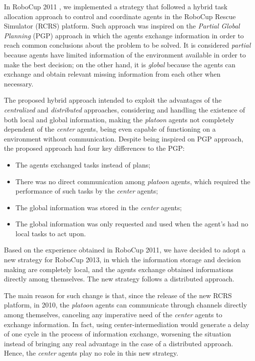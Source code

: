 In RoboCup 2011 \cite{pereiraEtAl2011-robocup}, we implemented a strategy that followed a hybrid task allocation approach to control and coordinate agents in the RoboCup Rescue Simulator (RCRS) platform. Such approach was inspired on the \textit{Partial Global Planning} (PGP) approach \cite{durfeeLesser1991} in which the agents exchange information in order to reach common conclusions about the problem to be solved. It is considered {\it partial} because agents have limited information of the environment available in order to make the best decision; on the other hand, it is {\it global} because the agents can exchange and obtain relevant missing information from each other when necessary.

The proposed hybrid approach intended to exploit the advantages of the {\it centralized} and {\it distributed} approaches, considering and handling the existence of both local and global information, making the {\it platoon} agents not completely dependent of the {\it center} agents, being even capable of functioning on a environment without communication. Despite being inspired on PGP approach, the proposed approach had four key differences to the PGP:
\begin{itemize}
\item The agents exchanged tasks instead of plans;
\item There was no direct communication among {\it platoon} agents, which required the performance of such tasks by the {\it center} agents;
\item The global information was stored in the {\it center} agents;
\item The global information was only requested and used when the agent's had no local tasks to act upon.
\end{itemize}

Based on the experience obtained in RoboCup 2011, we have decided to adopt a new strategy for RoboCup 2013, in which the information storage and decision making are completely local, and the agents exchange obtained informations directly among themselves. The new strategy follows a distributed approach.

The main reason for such change is that, since the release of the new RCRS platform, in 2010, the {\it platoon} agents can communicate through channels directly among themselves, canceling any imperative need of the {\it center} agents to exchange information. In fact, using center-intermediation would generate a delay of one cycle in the process of information exchange, worsening the situation instead of bringing any real advantage in the case of a distributed approach. Hence, the {\it center} agents play no role in this new strategy.


